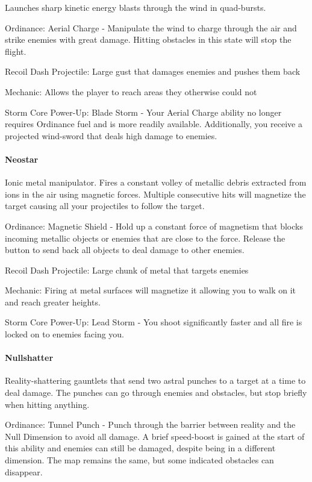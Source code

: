 \documentclass[../Main.tex]{subfiles}
\begin{document}
Launches sharp kinetic energy blasts through the wind in quad-bursts.

Ordinance: Aerial Charge - Manipulate the wind to charge through the air and strike enemies with great damage. Hitting obstacles in this state will stop the flight. 

Recoil Dash Projectile: Large gust that damages enemies and pushes them back

Mechanic: Allows the player to reach areas they otherwise could not

Storm Core Power-Up: Blade Storm - Your Aerial Charge ability no longer requires Ordinance fuel and is more readily available. Additionally, you receive a projected wind-sword that deals high damage to enemies. 

\paragraph{Neostar}

Ionic metal manipulator. Fires a constant volley of metallic debris extracted from ions in the air using magnetic forces. Multiple consecutive hits will magnetize the target causing all your projectiles to follow the target.

Ordinance: Magnetic Shield - Hold up a constant force of magnetism that blocks incoming metallic objects or enemies that are close to the force. Release the button to send back all objects to deal damage to other enemies. 

Recoil Dash Projectile: Large chunk of metal that targets enemies

Mechanic: Firing at metal surfaces will magnetize it allowing you to walk on it and reach greater heights. 

Storm Core Power-Up: Lead Storm - You shoot significantly faster and all fire is locked on to enemies facing you. 

\paragraph{Nullshatter}

Reality-shattering gauntlets that send two astral punches to a target at a time to deal damage. The punches can go through enemies and obstacles, but stop briefly when hitting anything.

Ordinance: Tunnel Punch - Punch through the barrier between reality and the Null Dimension to avoid all damage. A brief speed-boost is gained at the start of this ability and enemies can still be damaged, despite being in a different dimension. The map remains the same, but some indicated obstacles can disappear.
\end{document}
